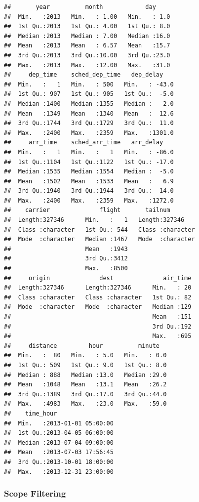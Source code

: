 \documentclass[]{book}
\begin{document}
\begin{verbatim}
##       year          month            day      
##  Min.   :2013   Min.   : 1.00   Min.   : 1.0  
##  1st Qu.:2013   1st Qu.: 4.00   1st Qu.: 8.0  
##  Median :2013   Median : 7.00   Median :16.0  
##  Mean   :2013   Mean   : 6.57   Mean   :15.7  
##  3rd Qu.:2013   3rd Qu.:10.00   3rd Qu.:23.0  
##  Max.   :2013   Max.   :12.00   Max.   :31.0  
##     dep_time    sched_dep_time   dep_delay     
##  Min.   :   1   Min.   : 500   Min.   : -43.0  
##  1st Qu.: 907   1st Qu.: 905   1st Qu.:  -5.0  
##  Median :1400   Median :1355   Median :  -2.0  
##  Mean   :1349   Mean   :1340   Mean   :  12.6  
##  3rd Qu.:1744   3rd Qu.:1729   3rd Qu.:  11.0  
##  Max.   :2400   Max.   :2359   Max.   :1301.0  
##     arr_time    sched_arr_time   arr_delay     
##  Min.   :   1   Min.   :   1   Min.   : -86.0  
##  1st Qu.:1104   1st Qu.:1122   1st Qu.: -17.0  
##  Median :1535   Median :1554   Median :  -5.0  
##  Mean   :1502   Mean   :1533   Mean   :   6.9  
##  3rd Qu.:1940   3rd Qu.:1944   3rd Qu.:  14.0  
##  Max.   :2400   Max.   :2359   Max.   :1272.0  
##    carrier              flight       tailnum         
##  Length:327346      Min.   :   1   Length:327346     
##  Class :character   1st Qu.: 544   Class :character  
##  Mode  :character   Median :1467   Mode  :character  
##                     Mean   :1943                     
##                     3rd Qu.:3412                     
##                     Max.   :8500                     
##     origin              dest              air_time  
##  Length:327346      Length:327346      Min.   : 20  
##  Class :character   Class :character   1st Qu.: 82  
##  Mode  :character   Mode  :character   Median :129  
##                                        Mean   :151  
##                                        3rd Qu.:192  
##                                        Max.   :695  
##     distance         hour          minute    
##  Min.   :  80   Min.   : 5.0   Min.   : 0.0  
##  1st Qu.: 509   1st Qu.: 9.0   1st Qu.: 8.0  
##  Median : 888   Median :13.0   Median :29.0  
##  Mean   :1048   Mean   :13.1   Mean   :26.2  
##  3rd Qu.:1389   3rd Qu.:17.0   3rd Qu.:44.0  
##  Max.   :4983   Max.   :23.0   Max.   :59.0  
##    time_hour                  
##  Min.   :2013-01-01 05:00:00  
##  1st Qu.:2013-04-05 06:00:00  
##  Median :2013-07-04 09:00:00  
##  Mean   :2013-07-03 17:56:45  
##  3rd Qu.:2013-10-01 18:00:00  
##  Max.   :2013-12-31 23:00:00
\end{verbatim}

\subsubsection{Scope Filtering}\label{scope-filtering}
\end{document}
